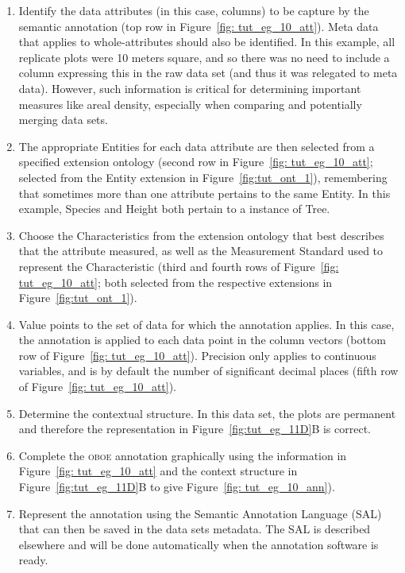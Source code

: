 \documentclass[article,oneside]{memoir}
\newcommand{\obs}{\textsc{oboe}}
\begin{document}
\begin{enumerate}

\item Identify the data attributes (in this case, columns) to be
  capture by the semantic annotation (top row in Figure~\ref{fig:
    tut_eg_10_att}).  Meta data that applies to whole-attributes
  should also be identified.  In this example, all replicate plots
  were 10 meters square, and so there was no need to include a column
  expressing this in the raw data set (and thus it was relegated to
  meta data).  However, such information is critical for determining
  important measures like areal density, especially when comparing and
  potentially merging data sets.

\item The appropriate Entities for each data attribute are then
  selected from a specified extension ontology (second row in
  Figure~\ref{fig: tut_eg_10_att}; selected from the Entity extension
  in Figure~\ref{fig:tut_ont_1}), remembering that sometimes more than
  one attribute pertains to the same Entity.  In this example, Species
  and Height both pertain to a instance of Tree.

\item Choose the Characteristics from the extension ontology that best
  describes that the attribute measured, as well as the Measurement
  Standard used to represent the Characteristic (third and fourth rows
  of Figure~\ref{fig: tut_eg_10_att}; both selected from the
  respective extensions in Figure~\ref{fig:tut_ont_1}).

\item Value points to the set of data for which the annotation
  applies.  In this case, the annotation is applied to each data point
  in the column vectors (bottom row of Figure~\ref{fig:
    tut_eg_10_att}).  Precision only applies to continuous variables,
  and is by default the number of significant decimal places (fifth
  row of Figure~\ref{fig: tut_eg_10_att}).

\item Determine the contextual structure.  In this data set, the plots
  are permanent and therefore the representation in
  Figure~\ref{fig:tut_eg_11D}B is correct.

\item Complete the \obs{} annotation graphically using the information
  in Figure~\ref{fig: tut_eg_10_att} and the context structure in
  Figure~\ref{fig:tut_eg_11D}B to give Figure~\ref{fig:
    tut_eg_10_ann}).
	
\item Represent the annotation using the Semantic Annotation Language
  (SAL) that can then be saved in the data sets metadata.  The SAL is
  described elsewhere and will be done automatically when the
  annotation software is ready.

\end{enumerate}
\end{document}
